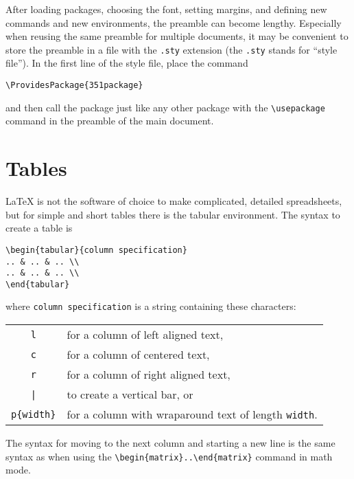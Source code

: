 \documentclass[11pt]{article}
\begin{document}
After loading packages, choosing the font, setting margins, and defining new commands
and new environments, the preamble can become lengthy.  Especially when reusing the 
same preamble for multiple documents, it may be convenient to store the preamble
in a file with the \verb~.sty~ extension (the \verb~.sty~ stands for ``style file'').
In the first line of the style file, place the command 
\begin{verbatim}
\ProvidesPackage{351package}
\end{verbatim}
and then call the package just like any other package with the 
\verb~\usepackage~ command in the preamble of the main document.

\section{Tables}

\LaTeX{} is not the software of choice to make complicated, detailed spreadsheets, 
but for simple and short tables there is the tabular environment.  The syntax
to create a table is 
\begin{verbatim}
\begin{tabular}{column specification}
.. & .. & .. \\
.. & .. & .. \\
\end{tabular}
\end{verbatim}
where \verb~column specification~ is a string containing these characters:
\begin{center}
\begin{tabular}{cl}
\verb~l~ & for a column of left aligned text, \\
\verb~c~ & for a column of centered text, \\
\verb~r~ & for a column of right aligned text, \\ 
\verb~|~ & to create a vertical bar, or \\
\verb~p{width}~ & for a column with wraparound text of length \verb~width~.
\end{tabular}
\end{center}
The syntax for moving to the next column and starting a new line is the same 
syntax as when using the \verb~\begin{matrix}..\end{matrix}~ command in math mode.
\end{document}
